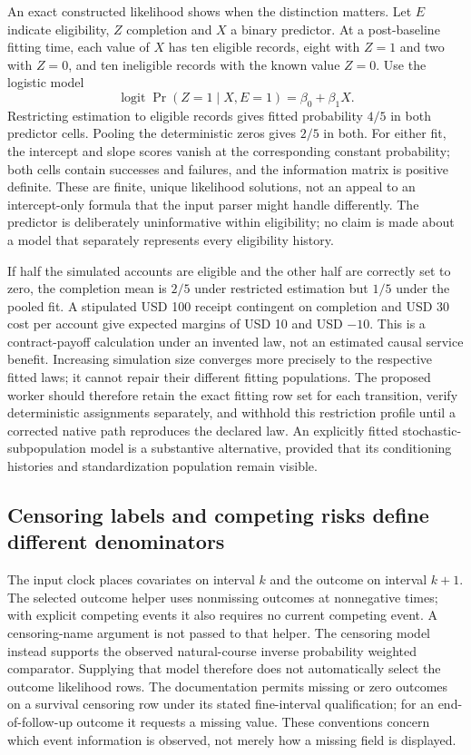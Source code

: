 An exact constructed likelihood shows when the distinction matters. Let
$E$ indicate eligibility, $Z$ completion and $X$ a binary predictor. At a
post-baseline fitting time, each value of $X$ has ten eligible records,
eight with $Z=1$ and two with $Z=0$, and ten ineligible records with the known
value $Z=0$. Use the logistic model
\[
 \operatorname{logit}\Pr(Z=1\mid X,E=1)=\beta_0+\beta_1X.
\]
Restricting estimation to eligible records gives fitted probability $4/5$
in both predictor cells. Pooling the deterministic zeros gives $2/5$ in both.
For either fit, the intercept and slope scores vanish at the corresponding
constant probability; both cells contain successes and failures, and the
information matrix is positive definite. These are finite, unique likelihood
solutions, not an appeal to an intercept-only formula that the input parser
might handle differently. The predictor is deliberately uninformative within
eligibility; no claim is made about a model that separately represents every
eligibility history.~\citep{rel25pygwitness}

If half the simulated accounts are eligible and the other half are correctly
set to zero, the completion mean is $2/5$ under restricted estimation but
$1/5$ under the pooled fit. A stipulated USD 100 receipt contingent on completion
and USD 30 cost per account give expected margins of USD 10 and USD $-10$.
This is a contract-payoff calculation under an invented law, not an estimated
causal service benefit. Increasing simulation size converges more precisely
to the respective fitted laws; it cannot repair their different fitting
populations. The proposed worker should therefore retain the exact fitting
row set for each transition, verify deterministic assignments separately, and
withhold this restriction profile until a corrected native path reproduces
the declared law. An explicitly fitted stochastic-subpopulation model is a
substantive alternative, provided that its conditioning histories and
standardization population remain visible.~\citep{rel25pygwitness,rel25pygfit}

\subsection{Censoring labels and competing risks define different denominators}
The input clock places covariates on interval $k$ and the outcome on
interval $k+1$. The selected outcome helper uses nonmissing outcomes at
nonnegative times; with explicit competing events it also requires no current
competing event. A censoring-name argument is not passed to that helper.
The censoring model instead supports the observed natural-course inverse
probability weighted comparator. Supplying that model therefore does not
automatically select the outcome likelihood rows. The documentation permits
missing or zero outcomes on a survival censoring row under its stated
fine-interval qualification; for an end-of-follow-up outcome it requests a
missing value. These conventions concern which event information is observed,
not merely how a missing field is displayed.~\citep{rel25pygfit}

